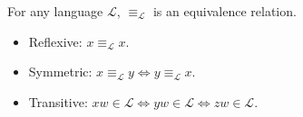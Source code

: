 \documentclass{notes}
\begin{document}
\begin{prop}
  For any language $\mathcal L$, $\equiv_{\mathcal L}$ is an equivalence relation.
\end{prop}

\begin{prf}
  \begin{itemize}
    \item Reflexive: $x \equiv_{\mathcal L} x$.
      
    \item Symmetric: $x \equiv_{\mathcal L} y \Leftrightarrow y \equiv_{\mathcal L} x$.
      
    \item Transitive: $x w \in \mathcal L \Leftrightarrow y w \in \mathcal L \Leftrightarrow z w \in \mathcal L$.
  \end{itemize}
\end{prf}
\end{document}
